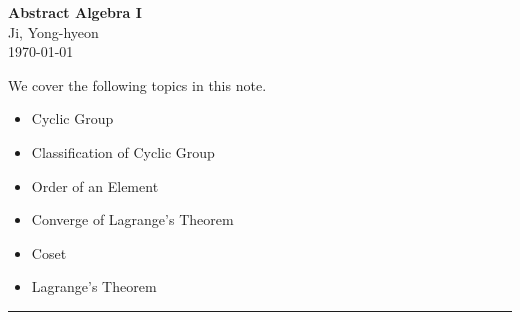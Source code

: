 \documentclass[11pt,openany]{article}
\begin{document}
\begin{center}
	\huge\textbf{Abstract Algebra I}\\
	\vspace{0.5em}
	\large{Ji, Yong-hyeon}\\
	\vspace{0.5em}
	\normalsize{\today}\\
\end{center}

\noindent 
We cover the following topics in this note.
\begin{itemize}
	\item Cyclic Group
	\item Classification of Cyclic Group
	\item Order of an Element
	\item Converge of Lagrange's Theorem
	\item Coset
	\item Lagrange's Theorem
\end{itemize}
\hrule\vspace{12pt}
\tableofcontents


\newpage
\end{document}
